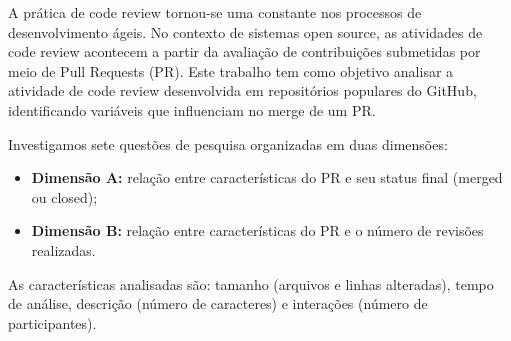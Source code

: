 A prática de code review tornou-se uma constante nos processos de desenvolvimento
ágeis. No contexto de sistemas open source, as atividades de code review
acontecem a partir da avaliação de contribuições submetidas por meio de
Pull Requests (PR). Este trabalho tem como objetivo analisar a atividade de
code review desenvolvida em repositórios populares do GitHub, identificando
variáveis que influenciam no merge de um PR.

Investigamos sete questões de pesquisa organizadas em duas dimensões:
\begin{itemize}
    \item \textbf{Dimensão A:} relação entre características do PR e seu status final (merged ou closed);
    \item \textbf{Dimensão B:} relação entre características do PR e o número de revisões realizadas.
\end{itemize}

As características analisadas são: tamanho (arquivos e linhas alteradas),
tempo de análise, descrição (número de caracteres) e interações
(número de participantes).
